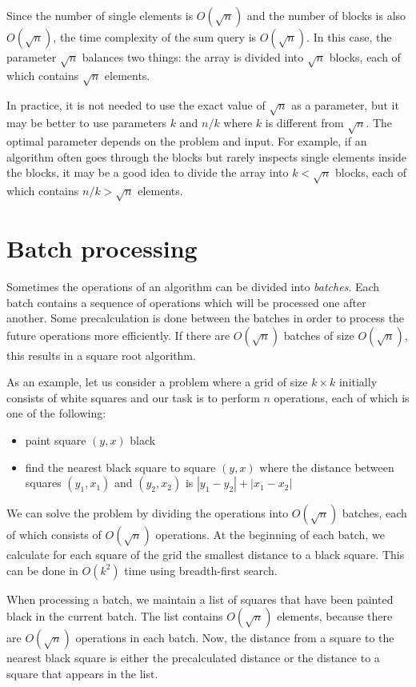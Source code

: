 Since the number of single elements is $O(\sqrt n)$
and the number of blocks is also $O(\sqrt n)$,
the time complexity of the sum query is $O(\sqrt n)$.
In this case, the parameter $\sqrt n$ balances two things:
the array is divided into $\sqrt n$ blocks,
each of which contains $\sqrt n$ elements.

In practice, it is not needed to use the
exact value of $\sqrt n$ as a parameter, but it may be better to
use parameters $k$ and $n/k$ where $k$ is
different from $\sqrt n$.
The optimal parameter depends on the problem and input.
For example, if an algorithm often goes
through the blocks but rarely inspects
single elements inside the blocks,
it may be a good idea to divide the array into
$k < \sqrt n$ blocks, each of which contains $n/k > \sqrt n$
elements.

\section{Batch processing}


Sometimes the operations of an algorithm
can be divided into \emph{batches}.
Each batch contains a sequence of operations
which will be processed one after another.
Some precalculation is done
between the batches
in order to process the future operations more efficiently.
If there are $O(\sqrt n)$ batches of size $O(\sqrt n)$,
this results in a square root algorithm.

As an example, let us consider a problem
where a grid of size $k \times k$
initially consists of white squares
and our task is to perform $n$ operations,
each of which is one of the following:
\begin{itemize}
\item
paint square $(y,x)$ black
\item
find the nearest black square to
square $(y,x)$ where the distance
between squares $(y_1,x_1)$ and $(y_2,x_2)$
is $|y_1-y_2|+|x_1-x_2|$
\end{itemize}

We can solve the problem by dividing
the operations into
$O(\sqrt n)$ batches, each of which consists
of $O(\sqrt n)$ operations.
At the beginning of each batch,
we calculate for each square of the grid
the smallest distance to a black square.
This can be done in $O(k^2)$ time using breadth-first search.

When processing a batch, we maintain a list of squares
that have been painted black in the current batch.
The list contains $O(\sqrt n)$ elements,
because there are $O(\sqrt n)$ operations in each batch.
Now, the distance from a square to the nearest black
square is either the precalculated distance or the distance
to a square that appears in the list.

